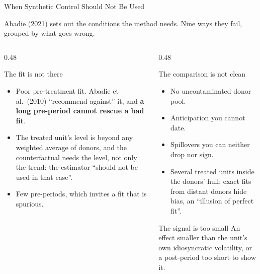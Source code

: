 \documentclass[main.tex]{subfiles}
\begin{document}
\begin{frame}{When Synthetic Control Should Not Be Used}

  Abadie (2021) sets out the conditions the method needs. Nine ways they
  fail, grouped by what goes wrong.

  \medskip
  \begin{columns}[T]
    \begin{column}{0.48\textwidth}
      \begin{alertblock}{\footnotesize The fit is not there}
        \footnotesize
        \begin{itemize}
          \item Poor pre-treatment fit. Abadie et al.\ (2010) ``recommend
            against'' it,
            and \textbf{a long pre-period cannot rescue a bad fit}.
          \item The treated unit's level is beyond any weighted average of
            donors, and the counterfactual needs the level, not only the
            trend: the estimator ``should not be used in that case''.
          \item Few pre-periods, which invites a fit that is spurious.
        \end{itemize}
      \end{alertblock}
    \end{column}
    \begin{column}{0.48\textwidth}
      \begin{alertblock}{\footnotesize The comparison is not clean}
        \footnotesize
        \begin{itemize}
          \item No uncontaminated donor pool.
          \item Anticipation you cannot date.
          \item Spillovers you can neither drop nor sign.
          \item Several treated units inside the donors' hull: exact fits
            from distant donors hide bias, an ``illusion of perfect fit''.
        \end{itemize}
      \end{alertblock}

      \smallskip
      \begin{block}{\footnotesize The signal is too small}
        \footnotesize
        An effect smaller than the unit's own idiosyncratic volatility, or a
        post-period too short to show it.
      \end{block}
    \end{column}
  \end{columns}

\end{frame}
\end{document}
